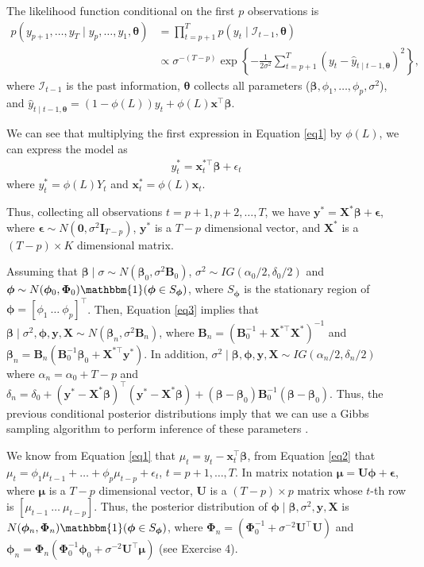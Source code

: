 The likelihood function conditional on the first $p$ observations is
\begin{align*}
	p(y_{p+1},\dots,y_T\mid y_{p},\dots,y_1,\bm{\theta})&=\prod_{t=p+1}^{T}p(y_t\mid \mathcal{I}_{t-1},\bm{\theta})\\
	&\propto \sigma^{-(T-p)}\exp\left\{-\frac{1}{2\sigma^2}\sum_{t=p+1}^T(y_t-\hat{y}_{t\mid t-1,\bm{\theta}})^2\right\},
\end{align*} 
where $\mathcal{I}_{t-1}$ is the past information, $\bm{\theta}$ collects all parameters ($\bm{\beta}, \phi_1,\dots,\phi_p, \sigma^2$), and $\hat{y}_{t\mid t-1,\bm{\theta}}=(1-\phi(L))y_t+\phi(L)\bm{x}^{\top}\bm{\beta}$.

We can see that multiplying the first expression in Equation \ref{eq1} by $\phi(L)$, we can express the model as 
\begin{align}\label{eq3}
	y_t^*=\bm{x}_t^{*\top}\bm{\beta}+\epsilon_t
\end{align}
where $y_t^*=\phi(L)Y_t$ and $\bm{x}_t^{*}=\phi(L)\bm{x}_t$.

Thus, collecting all observations $t=p+1,p+2,\dots,T$, we have $\bm{y}^*=\bm{X}^*\bm{\beta}+\bm{\epsilon}$, where $\bm{\epsilon}\sim N(\bm{0},\sigma^2\bm{I}_{T-p})$, $\bm{y}^*$ is a $T-p$ dimensional vector, and $\bm{X}^*$ is a $(T-p)\times K$ dimensional matrix.

Assuming that $\bm{\beta}\mid \sigma\sim N(\bm{\beta}_0,\sigma^2\bm{B}_0)$, $\sigma^2\sim IG(\alpha_0/2,\delta_0/2)$ and $\bm{\phi}\sim N(\bm{\phi}_0,\bm{\Phi}_0)\mathbbm{1}(\bm{\phi}\in S_{\bm{\phi}})$, where $S_{\bm{\phi}}$ is the stationary region of $\bm{\phi}=[\phi_1 \ \dots \ \phi_p]^{\top}$. Then, Equation \ref{eq3} implies that $\bm{\beta}\mid \sigma^2,\bm{\phi},\bm{y},\bm{X}\sim N(\bm{\beta}_n, \sigma^2{\bm{B}}_n)$, where $\bm{B}_n = (\bm{B}_0^{-1} + \bm{X}^{*\top}\bm{X}^{*})^{-1}$ and $\bm{\beta}_n = \bm{B}_n(\bm{B}_0^{-1}\bm{\beta}_0 + \bm{X}^{*\top}\bm{y}^{*})$. In addition, $\sigma^2\mid \bm{\beta},\bm{\phi},\bm{y},\bm{X}\sim IG(\alpha_n/2,\delta_n/2)$ where $\alpha_n=\alpha_0+T-p$ and $\delta_n=\delta_0+(\bm{y}^*-\bm{X}^{*}\bm{\beta})^{\top}(\bm{y}^*-\bm{X}^{*}\bm{\beta})+(\bm{\beta}-\bm{\beta}_0)\bm{B}_0^{-1}(\bm{\beta}-\bm{\beta}_0)$. Thus, the previous conditional posterior distributions imply that we can use a Gibbs sampling algorithm to perform inference of these parameters \cite{chib1993bayes}.

We know from Equation \ref{eq1} that $\mu_t=y_t-\bm{x}_t^{\top}\bm{\beta}$, from Equation \ref{eq2} that $\mu_t=\phi_1\mu_{t-1}+\dots+\phi_p\mu_{t-p}+\epsilon_t$, $t=p+1,\dots,T$. In matrix notation $\bm{\mu}=\bm{U}\bm{\phi}+\bm{\epsilon}$, where $\bm{\mu}$ is a $T-p$ dimensional vector, $\bm{U}$ is a $(T-p)\times p$ matrix whose $t$-th row is $[\mu_{t-1} \ \dots \ \mu_{t-p}]$. Thus, the posterior distribution of $\bm{\phi}\mid \bm{\beta},\sigma^2,\bm{y},\bm{X}$ is $N(\bm{\phi}_n, \bm{\Phi}_n)\mathbbm{1}(\bm{\phi}\in S_{\bm{\phi}})$, where $\bm{\Phi}_n=(\bm{\Phi}_0^{-1}+\sigma^{-2}\bm{U}^{\top}\bm{U})$ and $\bm{\phi}_n=\bm{\Phi}_n(\bm{\Phi}_0^{-1}\bm{\phi}_0+\sigma^{-2}\bm{U}^{\top}\bm{\mu})$ (see Exercise 4).

